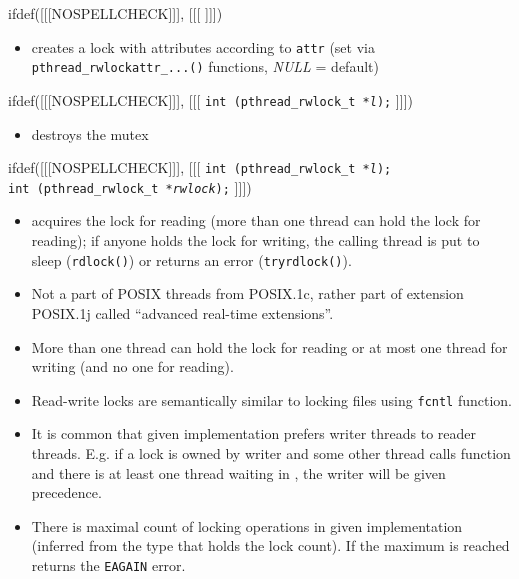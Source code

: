 \begin{slide}
\prgchars
ifdef([[[NOSPELLCHECK]]], [[[
]]])
\begin{itemize}
\item creates a lock with attributes according to \texttt{attr}
(set via \texttt{pthread\_rwlockattr\_...()} functions, \emph{NULL} = default)
\end{itemize}
ifdef([[[NOSPELLCHECK]]], [[[
\texttt{int (pthread\_rwlock\_t *\emph{l});}
]]])
\begin{itemize}
\item destroys the mutex
\end{itemize}
ifdef([[[NOSPELLCHECK]]], [[[
\texttt{int (pthread\_rwlock\_t *\emph{l});}\\
\texttt{int (pthread\_rwlock\_t *\emph{rwlock});}
]]])
\begin{itemize}
\item acquires the lock for reading (more than one thread can hold the lock
for reading); if anyone holds the lock for writing, the calling thread is put
to sleep (\texttt{rdlock()}) or returns an error (\texttt{tryrdlock()}).
\end{itemize}
\end{slide}

\label{RWLOCKS}

\begin{itemize}
\item Not a part of POSIX threads from POSIX.1c, rather part of extension
POSIX.1j called ``advanced real-time extensions''.
\item More than one thread can hold the lock for reading or at most one
thread for writing (and no one for reading).
\item Read-write locks are semantically similar to locking files using
\texttt{fcntl} function.
\item It is common that given implementation prefers writer threads to
reader threads. E.g. if a lock is owned by writer and some other thread
calls function  and there is at least one thread
waiting in , the writer will be given precedence.
\item There is maximal count of locking operations in given implementation
(inferred from the type that holds the lock count). If the maximum is reached
 returns the \texttt{EAGAIN} error.
\end{itemize}

